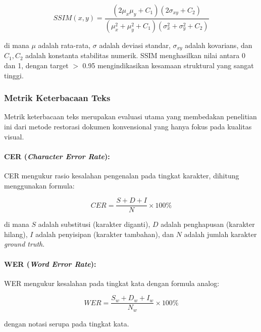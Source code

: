 \documentclass[12pt,a4paper]{article}
\begin{document}
\begin{equation}
SSIM(x, y) = \frac{(2\mu_x\mu_y + C_1)(2\sigma_{xy} + C_2)}{(\mu_x^2 + \mu_y^2 + C_1)(\sigma_x^2 + \sigma_y^2 + C_2)}
\end{equation}

di mana $\mu$ adalah rata-rata, $\sigma$ adalah deviasi standar, $\sigma_{xy}$ adalah kovarians, dan $C_1, C_2$ adalah konstanta stabilitas numerik. SSIM menghasilkan nilai antara 0 dan 1, dengan target $>$ 0.95 mengindikasikan kesamaan struktural yang sangat tinggi.

\subsubsection{Metrik Keterbacaan Teks}
Metrik keterbacaan teks merupakan evaluasi utama yang membedakan penelitian ini dari metode restorasi dokumen konvensional yang hanya fokus pada kualitas visual.

\paragraph{CER (\textit{Character Error Rate}):}
CER mengukur rasio kesalahan pengenalan pada tingkat karakter, dihitung menggunakan formula:

\begin{equation}
CER = \frac{S + D + I}{N} \times 100\%
\end{equation}

di mana $S$ adalah substitusi (karakter diganti), $D$ adalah penghapusan (karakter hilang), $I$ adalah penyisipan (karakter tambahan), dan $N$ adalah jumlah karakter \textit{ground truth}.

\paragraph{WER (\textit{Word Error Rate}):}
WER mengukur kesalahan pada tingkat kata dengan formula analog:

\begin{equation}
WER = \frac{S_w + D_w + I_w}{N_w} \times 100\%
\end{equation}

dengan notasi serupa pada tingkat kata.
\end{document}

